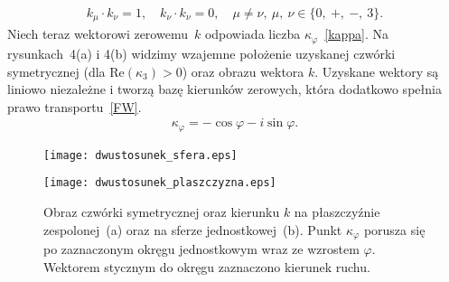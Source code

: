 \begin{align*}
k_\mu \cdot k_\nu = 1 , 
\quad k_\nu \cdot k_\nu = 0,\quad \mu \neq \nu ,\ 
\mu,\ \nu \in \{0,\ +,\ -,\ 3\}.
\end{align*} 
\newpage
Niech teraz wektorowi zerowemu~$k$ odpowiada 
liczba $\kappa_\varphi$~\eqref{kappa}.
Na rysunkach~4(a) i 4(b)
widzimy wzajemne położenie 
uzyskanej czwórki symetrycznej (dla Re$ (\kappa_3) >0$) 
oraz obrazu wektora $k$. 
Uzyskane wektory są liniowo niezależne i tworzą bazę 
kierunków zerowych, która dodatkowo spełnia 
prawo transportu~\eqref{FW}.
\begin{align}\label{kappa}
\kappa_\varphi = -\cos\varphi - i \sin \varphi .
\end{align}
\begin{figure}[h]
\begin{minipage}[b]{.5\linewidth}
\centering
\texttt{[image: dwustosunek\_sfera.eps]}
\subcaption{}
\end{minipage}%
\begin{minipage}[b]{.5\linewidth}
\centering
\texttt{[image: dwustosunek\_plaszczyzna.eps]}
\subcaption{}
\end{minipage}
\caption{Obraz czwórki symetrycznej oraz kierunku $k$ na płaszczyźnie 
zespolonej~(a) oraz na sferze jednostkowej~(b).
Punkt $\kappa_\varphi$ porusza się po zaznaczonym okręgu jednostkowym 
wraz ze wzrostem $\varphi$. Wektorem stycznym do okręgu zaznaczono 
kierunek ruchu.}
\label{dwustosunek_plaszczyzna}
\end{figure}
